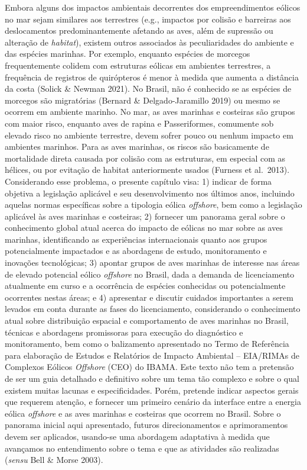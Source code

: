 \documentclass[
  oneside]{scrbook}
\begin{document}
Embora alguns dos impactos ambientais decorrentes dos empreendimentos eólicos no mar sejam similares aos terrestres (e.g., impactos por colisão e barreiras aos deslocamentos predominantemente afetando as aves, além de supressão ou alteração de \emph{habitat}), existem outros associados às peculiaridades do ambiente e das espécies marinhas. Por exemplo, enquanto espécies de morcegos frequentemente colidem com estruturas eólicas em ambientes terrestres, a frequência de registros de quirópteros é menor à medida que aumenta a distância da costa (Solick \& Newman 2021). No Brasil, não é conhecido se as espécies de morcegos são migratórias (Bernard \& Delgado-Jaramillo 2019) ou mesmo se ocorrem em ambiente marinho. No mar, as aves marinhas e costeiras são grupos com maior risco, enquanto aves de rapina e Passeriformes, comumente sob elevado risco no ambiente terrestre, devem sofrer pouco ou nenhum impacto em ambientes marinhos. Para as aves marinhas, os riscos são basicamente de mortalidade direta causada por colisão com as estruturas, em especial com as hélices, ou por evitação de habitat anteriormente usados (Furness et al.~2013). Considerando esse problema, o presente capítulo visa: 1) indicar de forma objetiva a legislação aplicável e seu desenvolvimento nos últimos anos, incluindo aquelas normas específicas sobre a tipologia eólica \emph{offshore}, bem como a legislação aplicável às aves marinhas e costeiras; 2) fornecer um panorama geral sobre o conhecimento global atual acerca do impacto de eólicas no mar sobre as aves marinhas, identificando as experiências internacionais quanto aos grupos potencialmente impactados e as abordagens de estudo, monitoramento e inovações tecnológicas; 3) apontar grupos de aves marinhas de interesse nas áreas de elevado potencial eólico \emph{offshore} no Brasil, dada a demanda de licenciamento atualmente em curso e a ocorrência de espécies conhecidas ou potencialmente ocorrentes nestas áreas; e 4) apresentar e discutir cuidados importantes a serem levados em conta durante as fases do licenciamento, considerando o conhecimento atual sobre distribuição espacial e comportamento de aves marinhas no Brasil, técnicas e abordagens promissoras para execução do diagnóstico e monitoramento, bem como o balizamento apresentado no Termo de Referência para elaboração de Estudos e Relatórios de Impacto Ambiental -- EIA/RIMAs de Complexos Eólicos \emph{Offshore} (CEO) do IBAMA. Este texto não tem a pretensão de ser um guia detalhado e definitivo sobre um tema tão complexo e sobre o qual existem muitas lacunas e especificidades. Porém, pretende indicar aspectos gerais que requerem atenção, e fornecer um primeiro cenário da interface entre a energia eólica \emph{offshore} e as aves marinhas e costeiras que ocorrem no Brasil. Sobre o panorama inicial aqui apresentado, futuros direcionamentos e aprimoramentos devem ser aplicados, usando-se uma abordagem adaptativa à medida que avançamos no entendimento sobre o tema e que as atividades são realizadas (\emph{sensu} Bell \& Morse 2003).
\end{document}

